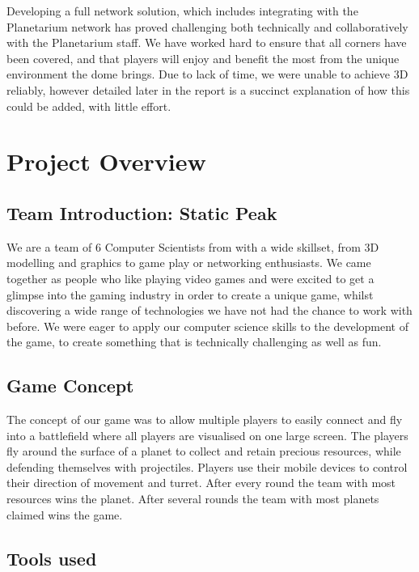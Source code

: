 \documentclass[11pt,a4paper]{article}
\begin{document}
 Developing a full network solution, which includes integrating with the Planetarium network has proved challenging both technically and collaboratively with the Planetarium staff. We have worked hard to ensure that all corners have been covered, and that players will enjoy and benefit the most from the unique environment the dome brings. Due to lack of time, we were unable to achieve 3D reliably, however detailed later in the report is a succinct explanation of how this could be added, with little effort.



\pagebreak







\section{Project Overview}

\subsection{Team Introduction: Static Peak} 
 We are a team of 6 Computer Scientists from with a wide skillset, from 3D modelling and graphics to game play or networking enthusiasts. We came together as people who like playing video games and were excited to get a glimpse into the gaming industry in order to create a unique game, whilst discovering a wide range of technologies we have not had the chance to work with before. We were eager to apply our computer science skills to the development of the game, to create something that is technically challenging as well as fun.

 \subsection{Game Concept}
  The concept of our game was to allow multiple players to easily connect and fly into a battlefield where all players are visualised on one large screen. The players fly around the surface of a planet to collect and retain precious resources, while defending themselves with projectiles. Players use their mobile devices to control their direction of movement and turret. After every round the team with most resources wins the planet. After several rounds the team with most planets claimed wins the game.

 \subsection{Tools used}
\end{document}
